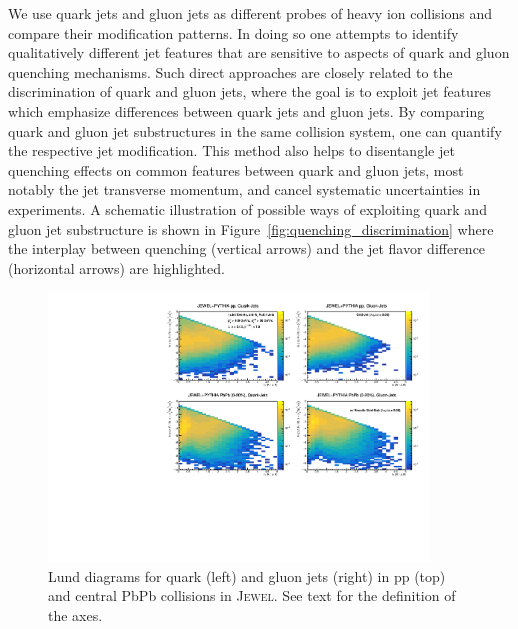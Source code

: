 \documentclass[notoc,preprintnumbers]{JHEP3}
\begin{document}
We use quark jets and gluon jets as different probes of heavy ion collisions and compare their modification patterns. In doing so one attempts to identify qualitatively different jet features that are sensitive to aspects of quark and gluon quenching mechanisms. Such direct approaches are closely related to the discrimination of quark and gluon jets, where the goal is to exploit jet features which emphasize differences between quark jets and gluon jets. By comparing quark and gluon jet substructures in the same collision system, one can quantify the respective jet modification. This method also helps to disentangle jet quenching effects on common features between quark and gluon jets, most notably the jet transverse momentum, and cancel systematic uncertainties in experiments. A schematic illustration of possible ways of exploiting quark and gluon jet substructure is shown in Figure~\ref{fig:quenching_discrimination} where the interplay between quenching (vertical arrows) and the jet flavor difference (horizontal arrows) are highlighted.

\begin{figure}[t]
	\centering
	\includegraphics[width=0.9\textwidth]{plots/Individual_LundDiagrams_zrel.pdf}
	\caption{Lund diagrams for quark (left) and gluon jets (right) in pp (top) and central PbPb collisions in \textsc{Jewel}. See text for the definition of the axes.}
\label{fig:Lund_full}
\end{figure}
\end{document}
